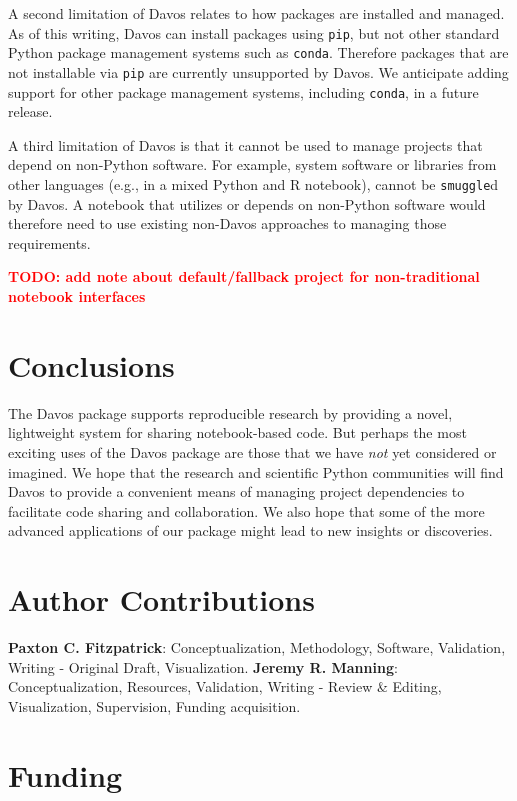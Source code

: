 \documentclass[preprint,12pt,a4paper]{elsarticle}
\begin{document}
A second limitation of Davos relates to how packages are installed and managed.
As of this writing, Davos can install packages using \texttt{pip}, but not
other standard Python package management systems such as \texttt{conda}.
Therefore packages that are not installable via \texttt{pip} are currently
unsupported by Davos. We anticipate adding support for other package management
systems, including \texttt{conda}, in a future release.

A third limitation of Davos is that it cannot be used to manage projects that
depend on non-Python software. For example, system software or libraries from
other languages (e.g., in a mixed Python and R notebook), cannot be
\texttt{smuggle}d by Davos. A notebook that utilizes or depends on non-Python
software would therefore need to use existing non-Davos approaches to managing
those requirements.

\textcolor{red}{\textbf{TODO: add note about default/fallback project for non-traditional notebook interfaces}}

\section{Conclusions}

The Davos package supports reproducible research by providing
a novel, lightweight system for sharing notebook-based code. But
perhaps the most exciting uses of the Davos package are those
that we have \textit{not} yet considered or imagined. We hope that the
research and scientific Python communities will find Davos to provide a convenient
means of managing project dependencies to facilitate code sharing and collaboration. We
also hope that some of the more advanced applications of our package
might lead to new insights or discoveries.


\section*{Author Contributions}

\textbf{Paxton C. Fitzpatrick}: Conceptualization, Methodology,
Software, Validation, Writing - Original Draft,
Visualization. \textbf{Jeremy R. Manning}: Conceptualization,
Resources, Validation, Writing - Review \& Editing, Visualization, Supervision,
Funding acquisition.

\section*{Funding}
\end{document}

